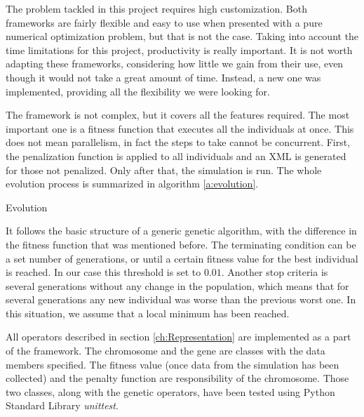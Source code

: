 The problem tackled in this project requires high customization. Both frameworks are fairly flexible and easy to use when presented with a pure numerical optimization problem, but that is not the case. Taking into account the time limitations for this project, productivity is really important. It is not worth adapting these frameworks, considering how little we gain from their use, even though it would not take a great amount of time. Instead, a new one was implemented, providing all the flexibility we were looking for.

The framework is not complex, but it covers all the features required. The most important one is a fitness function that executes all the individuals at once. This does not mean parallelism, in fact the steps to take cannot be concurrent. First, the penalization function is applied to all individuals and an XML is generated for those not penalized. Only after that, the simulation is run. The whole evolution process is summarized in algorithm \ref{a:evolution}.


\begin{algorithm}
	\caption{Evolution}
	\label{a:evolution}
\end{algorithm}

It follows the basic structure of a generic genetic algorithm, with the difference in the fitness function that was mentioned before. The terminating condition can be a set number of generations, or until a certain fitness value for the best individual is reached. In our case this threshold is set to $0.01$. Another stop criteria is several generations without any change in the population, which means that for several generations any new individual was worse than the previous worst one. In this situation, we assume that a local minimum has been reached.

All operators described in section \ref{ch:Representation} are implemented as a part of the framework. The chromosome and the gene are classes with the data members specified. The fitness value (once data from the simulation has been collected) and the penalty function are responsibility of the chromosome. Those two classes, along with the genetic operators, have been tested using Python Standard Library \textit{unittest}.

